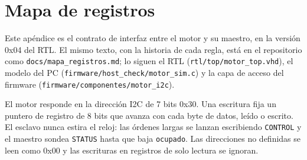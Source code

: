 \sloppy

\chapter{Mapa de registros}
\label{app:regs}

Este apéndice es el contrato de interfaz entre el motor y su maestro, en
la versión 0x04 del \ac{RTL}. El mismo texto, con la historia de cada
regla, está en el repositorio como \nolinkurl{docs/mapa_registros.md}; lo
siguen el \ac{RTL} (\nolinkurl{rtl/top/motor_top.vhd}), el modelo del PC
(\nolinkurl{firmware/host_check/motor_sim.c}) y la capa de acceso del
firmware (\nolinkurl{firmware/componentes/motor_i2c}).

El motor responde en la dirección \ac{I2C} de 7 bits 0x30. Una escritura
fija un puntero de registro de 8 bits que avanza con cada byte de datos,
leído o escrito. El esclavo nunca estira el reloj: las órdenes largas se
lanzan escribiendo \texttt{CONTROL} y el maestro sondea \texttt{STATUS}
hasta que baja \texttt{ocupado}. Las direcciones no definidas se leen como
0x00 y las escrituras en registros de solo lectura se ignoran.

